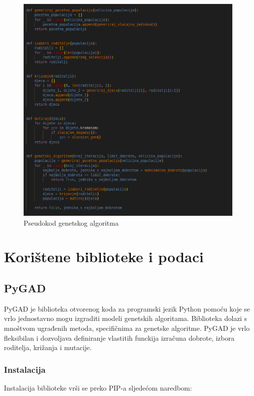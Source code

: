 \documentclass[times, utf8, zavrsni]{fer}
\begin{document}
\begin{figure}[htb]
\centering
\includegraphics[width=14cm]{images/genetski_algoritam_pseudokod.png}
\caption{Pseudokod genetskog algoritma}
\label{fig:pseudokod genetskog algoritma}
\end{figure}

\chapter{Korištene biblioteke i podaci}

\section{PyGAD}
PyGAD je biblioteka otvorenog koda za programski jezik Python pomoću koje se vrlo jednostavno mogu izgraditi modeli genetskih algoritama. Biblioteka dolazi s mnoštvom ugrađenih metoda, specifičnima za genetske algoritme. PyGAD je vrlo fleksibilan i dozvoljava definiranje vlastitih funckija izračuna dobrote, izbora roditelja, križanja i mutacije.

\subsection{Instalacija}
Instalacija biblioteke vrši se preko PIP-a sljedećom naredbom:
\end{document}
